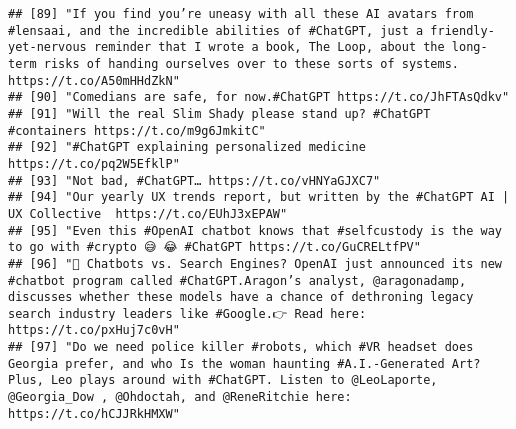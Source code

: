 \documentclass[
]{article}
\begin{document}
\begin{verbatim}
## [89] "If you find you’re uneasy with all these AI avatars from #lensaai, and the incredible abilities of #ChatGPT, just a friendly-yet-nervous reminder that I wrote a book, The Loop, about the long-term risks of handing ourselves over to these sorts of systems. https://t.co/A50mHHdZkN"                       
## [90] "Comedians are safe, for now.#ChatGPT https://t.co/JhFTAsQdkv"                                                                                                                                                                                                                                                  
## [91] "Will the real Slim Shady please stand up? #ChatGPT #containers https://t.co/m9g6JmkitC"                                                                                                                                                                                                                        
## [92] "#ChatGPT explaining personalized medicine https://t.co/pq2W5EfklP"                                                                                                                                                                                                                                             
## [93] "Not bad, #ChatGPT… https://t.co/vHNYaGJXC7"                                                                                                                                                                                                                                                                    
## [94] "Our yearly UX trends report, but written by the #ChatGPT AI | UX Collective  https://t.co/EUhJ3xEPAW"                                                                                                                                                                                                          
## [95] "Even this #OpenAI chatbot knows that #selfcustody is the way to go with #crypto 😅 😂 #ChatGPT https://t.co/GuCRELtfPV"                                                                                                                                                                                        
## [96] "🔎 Chatbots vs. Search Engines? OpenAI just announced its new #chatbot program called #ChatGPT.Aragon’s analyst, @aragonadamp, discusses whether these models have a chance of dethroning legacy search industry leaders like #Google.👉 Read here: https://t.co/pxHuj7c0vH"                                   
## [97] "Do we need police killer #robots, which #VR headset does Georgia prefer, and who Is the woman haunting #A.I.-Generated Art? Plus, Leo plays around with #ChatGPT. Listen to @LeoLaporte, @Georgia_Dow , @Ohdoctah, and @ReneRitchie here: https://t.co/hCJJRkHMXW"
\end{verbatim}
\end{document}
